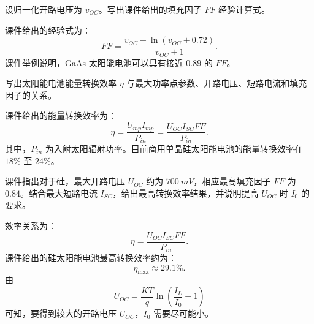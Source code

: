 \begin{problem}[填充因子经验式]\label{exer:calc_04_solar_p126_01}
设归一化开路电压为 \(v_{OC}\)。写出课件给出的填充因子 \(FF\) 经验计算式。
\end{problem}

\begin{solution}
课件给出的经验式为：
\begin{equation}
FF = \frac{v_{OC} - \ln(v_{OC}+0.72)}{v_{OC}+1}.
\end{equation}
课件举例说明，GaAs 太阳能电池可以具有接近 \(0.89\) 的 \(FF\)。
\end{solution}

\begin{problem}[太阳能电池能量转换效率]\label{exer:calc_04_solar_p127_01}
写出太阳能电池能量转换效率 \(\eta\) 与最大功率点参数、开路电压、短路电流和填充因子的关系。
\end{problem}

\begin{solution}
课件给出的能量转换效率为：
\begin{equation}
\eta = \frac{U_{mp}I_{mp}}{P_{in}}
= \frac{U_{OC}I_{SC}FF}{P_{in}}.
\end{equation}
其中，\(P_{in}\) 为入射太阳辐射功率。目前商用单晶硅太阳能电池的能量转换效率在 \(18\%\) 至 \(24\%\)。
\end{solution}

\begin{problem}[硅太阳能电池极限效率]\label{exer:calc_04_solar_p131_01}
课件指出对于硅，最大开路电压 \(U_{OC}\) 约为 \(\qty{700}{mV}\)，相应最高填充因子 \(FF\) 为 \(0.84\)。结合最大短路电流 \(I_{SC}\)，给出最高转换效率结果，并说明提高 \(U_{OC}\) 时 \(I_0\) 的要求。
\end{problem}

\begin{solution}
效率关系为：
\begin{equation}
\eta = \frac{U_{OC}I_{SC}FF}{P_{in}}.
\end{equation}
课件给出的硅太阳能电池最高转换效率约为：
\begin{equation}
\eta_{\max} \approx 29.1\%.
\end{equation}
由
\begin{equation}
U_{OC} = \frac{KT}{q}\ln\left(\frac{I_L}{I_0}+1\right)
\end{equation}
可知，要得到较大的开路电压 \(U_{OC}\)，\(I_0\) 需要尽可能小。
\end{solution}

